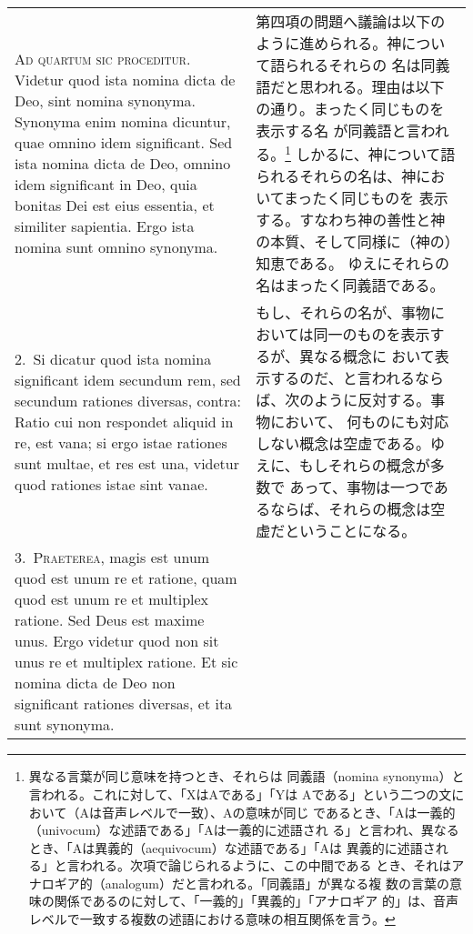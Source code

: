 \documentclass[paper=a4paper,fontsize=10pt,jafontsize=9pt,titlepage]{jlreq}
\begin{document}
\begin{longtable}{p{21em}p{21em}}

{\scshape Ad quartum sic proceditur}. Videtur quod
ista nomina dicta de Deo, sint nomina synonyma. Synonyma enim nomina
dicuntur, quae omnino idem significant. Sed ista nomina dicta de Deo,
omnino idem significant in Deo, quia bonitas Dei est eius essentia, et
similiter sapientia. Ergo ista nomina sunt omnino synonyma.

&

第四項の問題へ議論は以下のように進められる。神について語られるそれらの
名は同義語だと思われる。理由は以下の通り。まったく同じものを表示する名
が同義語と言われる。\footnote{異なる言葉が同じ意味を持つとき、それらは
同義語（nomina synonyma）と言われる。これに対して、「XはAである」「Yは
Aである」という二つの文において（Aは音声レベルで一致）、Aの意味が同じ
であるとき、「Aは一義的（univocum）な述語である」「Aは一義的に述語され
る」と言われ、異なるとき、「Aは異義的（aequivocum）な述語である」「Aは
異義的に述語される」と言われる。次項で論じられるように、この中間である
とき、それはアナロギア的（analogum）だと言われる。「同義語」が異なる複
数の言葉の意味の関係であるのに対して、「一義的」「異義的」「アナロギア
的」は、音声レベルで一致する複数の述語における意味の相互関係を言う。}
しかるに、神について語られるそれらの名は、神においてまったく同じものを
表示する。すなわち神の善性と神の本質、そして同様に（神の）知恵である。
ゆえにそれらの名はまったく同義語である。

\\

2.~Si dicatur quod ista nomina significant idem secundum rem, sed
secundum rationes diversas, contra: Ratio cui non respondet aliquid in
re, est vana; si ergo istae rationes sunt multae, et res est una,
videtur quod rationes istae sint vanae.

&

もし、それらの名が、事物においては同一のものを表示するが、異なる概念に
おいて表示するのだ、と言われるならば、次のように反対する。事物において、
何ものにも対応しない概念は空虚である。ゆえに、もしそれらの概念が多数で
あって、事物は一つであるならば、それらの概念は空虚だということになる。

\\

3.~{\scshape Praeterea}, magis est unum quod est unum re et ratione, quam
quod est unum re et multiplex ratione. Sed Deus est maxime unus. Ergo
videtur quod non sit unus re et multiplex ratione. Et sic nomina dicta
de Deo non significant rationes diversas, et ita sunt synonyma.


\end{longtable}
\end{document}
